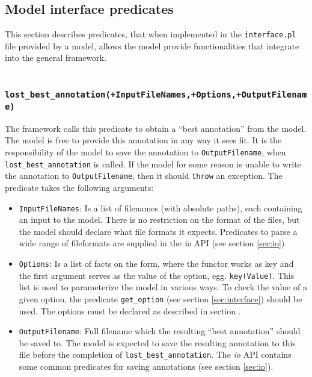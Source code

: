 \documentclass{book}
\begin{document}

\subsection{Model interface predicates}

This section describes predicates, that when implemented in 
the \texttt{interface.pl} file provided by a model, allows the 
model provide functionalities that integrate into the general framework.

\subsubsection{
  \texttt{
    lost\_best\_annotation(+InputFileNames,+Options,+OutputFilename)
  }
}

The framework calls this predicate to obtain a ``best annotation''
from the model. The model is free to provide this annotation in
any way it sees fit. It is the responsibility of the model to save the
annotation to \texttt{OutputFilename}, when
\texttt{lost\_best\_annotation} is called. If the model for some
reason is unable to write the annotation to \texttt{OutputFilename},
then it should \texttt{throw} an exception. The predicate takes the
following arguments:
\begin{itemize}

\item \texttt{InputFileNames}: Is a list of filenames (with absolute paths),
  each containing an input to the model. 
  There is no restriction on the format of the files, but the model
  should declare what file formats it expects.
  Predicates to parse a wide range of fileformats are supplied 
  in the \emph{io} API (see section \ref{sec:io}). 

\item \texttt{Options}: Is a list of facts on the form, where the functor
  works as key and the first argument serves as the value of the
  option, egg. \texttt{key(Value)}. This list is used to parameterize the model
  in various ways. To check the value of a given option, the predicate
  \texttt{get\_option} (see section \ref{sec:interface}) should be used.
  The options must be declared as described in section
  \label{sec:option_declarations}.

\item \texttt{OutputFilename}: Full filename which the resulting ``best
  annotation'' should be saved to. The model is expected to save
  the resulting annotation to this file before the completion of 
  \texttt{lost\_best\_annotation}. The \emph{io} API contains some
  common predicates for saving annotations (see section \ref{sec:io}).
\end{itemize}
\end{document}
